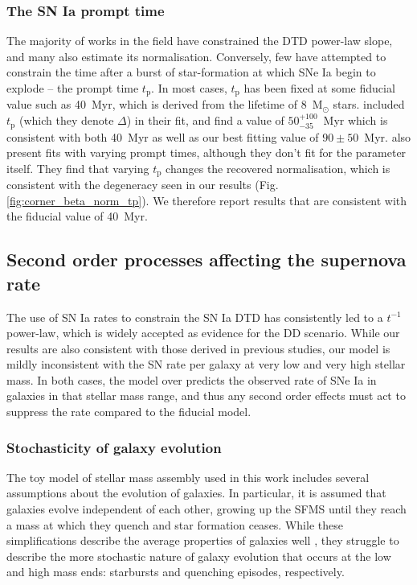 \documentclass[fleqn,usenatbib]{mnras}
\begin{document}
\subsubsection{The SN Ia prompt time \label{subsubsec:compare_tp}}

The majority of works in the field have constrained the DTD power-law slope, and many also estimate its normalisation. Conversely, few have attempted to constrain the time after a burst of star-formation at which SNe Ia begin to explode -- the prompt time $t_{\mathrm{p}}$. In most cases, $t_{\mathrm{p}}$ has been fixed at some fiducial value such as 40~Myr, which is derived from the lifetime of 8~M$_{\odot}$ stars. \citet{Castrillo2020} included $t_{\mathrm{p}}$ (which they denote $\Delta$) in their fit, and find a value of $50_{-35}^{+100}$~Myr which is consistent with both 40~Myr as well as our best fitting value of $90 \pm 50$~Myr. \citet{Heringer2019} also present fits with varying prompt times, although they don't fit for the parameter itself. They find that varying $t_{\mathrm{p}}$ changes the recovered normalisation, which is consistent with the degeneracy seen in our results (Fig. \ref{fig:corner_beta_norm_tp}). We therefore report results that are consistent with the fiducial value of 40~Myr. 

\subsection{Second order processes affecting the supernova rate \label{subsec:discussion}}

The use of SN Ia rates to constrain the SN Ia DTD has consistently led to a $t^{-1}$ power-law, which is widely accepted as evidence for the DD scenario. While our results are also consistent with those derived in previous studies, our model is mildly inconsistent with the SN rate per galaxy at very low and very high stellar mass. In both cases, the model over predicts the observed rate of SNe Ia in galaxies in that stellar mass range, and thus any second order effects must act to suppress the rate compared to the fiducial model.

\subsubsection{Stochasticity of galaxy evolution}

The toy model of stellar mass assembly used in this work includes several assumptions about the evolution of galaxies. In particular, it is assumed that galaxies evolve independent of each other, growing up the SFMS until they reach a mass at which they quench and star formation ceases. While these simplifications describe the average properties of galaxies well \citep{Zahid2012, Childress2014}, they struggle to describe the more stochastic nature of galaxy evolution that occurs at the low and high mass ends: starbursts and quenching episodes, respectively. 
\end{document}
